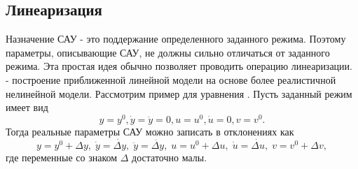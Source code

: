 \documentclass[../../TAU.tex]{subfiles}
\begin{document}
\subsection{Линеаризация}

    Назначение САУ - это поддержание определенного заданного режима. Поэтому параметры, описывающие САУ, не должны сильно отличаться от заданного режима. Эта простая идея обычно позволяет проводить операцию линеаризации.
     - построение приближенной линейной модели на основе более реалистичной нелинейной модели.
    Рассмотрим пример для уравнения 
    .
    Пусть заданный режим имеет вид
    \begin{equation}
        y = y^0, \dot y = \ddot y = 0, u=u^0, \dot u = 0, v=v^0.
    \end{equation}
    Тогда реальные параметры САУ можно записать в отклонениях как
    \begin{equation}
        y = y^0+\Delta y,\;\dot y = \dot{\Delta y},\;\ddot y = \ddot{\Delta y},\; u = u^0 + \Delta u,\; \dot u = \dot{\Delta u},\;v = v^0 + \Delta v,
    \end{equation}
    где переменные со знаком $\Delta$ достаточно малы.
\end{document}
